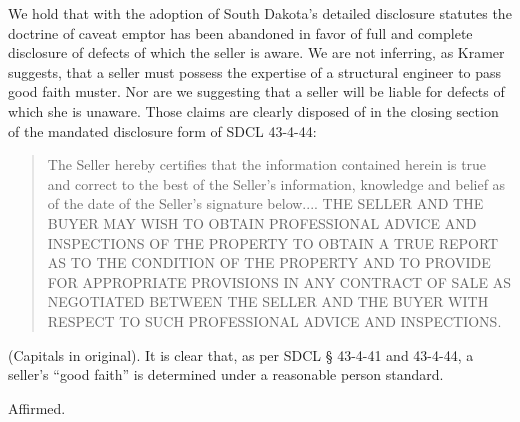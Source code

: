 We hold that with the adoption of South Dakota's detailed disclosure statutes
the doctrine of caveat emptor has been abandoned in favor of full and complete
disclosure of defects of which the seller is aware. We are not inferring, as
Kramer suggests, that a seller must possess the expertise of a structural
engineer to pass good faith muster. Nor are we suggesting that a seller will be
liable for defects of which she is unaware. Those claims are clearly disposed
of in the closing section of the mandated disclosure form of SDCL 43-4-44:
\begin{quote}
The Seller hereby certifies that the information contained herein is true and
correct to the best of the Seller's information, knowledge and belief as of the
date of the Seller's signature below.... THE SELLER AND THE BUYER MAY WISH TO
OBTAIN PROFESSIONAL ADVICE AND INSPECTIONS OF THE PROPERTY TO OBTAIN A TRUE
REPORT AS TO THE CONDITION OF THE PROPERTY AND TO PROVIDE FOR APPROPRIATE
PROVISIONS IN ANY CONTRACT OF SALE AS NEGOTIATED BETWEEN THE SELLER AND THE
BUYER WITH RESPECT TO SUCH PROFESSIONAL ADVICE AND INSPECTIONS.
\end{quote}
(Capitals in original). It is clear that, as per SDCL {\S} 43-4-41 and 43-4-44,
a seller's ``good faith'' is determined under a reasonable person standard.

Affirmed.


